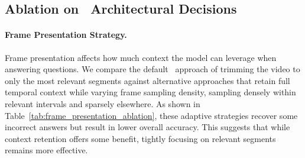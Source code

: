 \documentclass[letterpaper]{article} %
\begin{document}
    \begin{table}[t]
        \setlength{\tabcolsep}{1mm}
        \centering
        \caption{\textbf{Generalization to Narrative Video.} \nsvqa\ achieves the highest accuracy (\%) on CinePile, demonstrating its effectiveness in abstract, story-driven video domains.}
        \label{tab:cinepile-evals}
        \vspace{-1em}
    \end{table}

    \subsection{Ablation on \nsvqa\ Architectural Decisions}

        \paragraph{Frame Presentation Strategy.}
         Frame presentation affects how much context the model can leverage when answering questions. We compare the default \nsvqa\ approach of trimming the video to only the most relevant segments against alternative approaches that retain full temporal context while varying frame sampling density, sampling densely within relevant intervals and sparsely elsewhere. As shown in Table~\ref{tab:frame_presentation_ablation}, these adaptive strategies recover some incorrect answers but result in lower overall accuracy. This suggests that while context retention offers some benefit, tightly focusing on relevant segments remains more effective.
\end{document}
